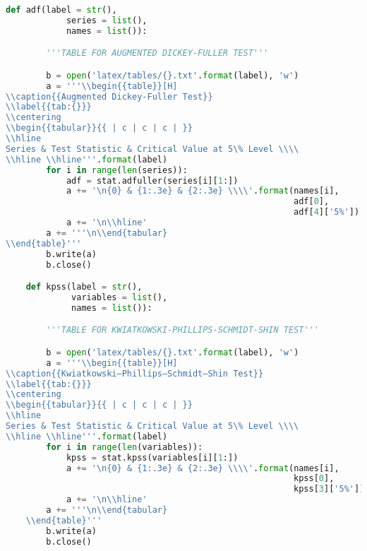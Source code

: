 \begin{lstlisting}[language=Python]
    def adf(label = str(),
            series = list(),
            names = list()):

        '''TABLE FOR AUGMENTED DICKEY-FULLER TEST'''

        b = open('latex/tables/{}.txt'.format(label), 'w')
        a = '''\\begin{{table}}[H]
\\caption{{Augmented Dickey-Fuller Test}}
\\label{{tab:{}}}
\\centering
\\begin{{tabular}}{{ | c | c | c | }}
\\hline
Series & Test Statistic & Critical Value at 5\% Level \\\\
\\hline \\hline'''.format(label)
        for i in range(len(series)):
            adf = stat.adfuller(series[i][1:])
            a += '\n{0} & {1:.3e} & {2:.3e} \\\\'.format(names[i],
                                                         adf[0],
                                                         adf[4]['5%'])
            a += '\n\\hline'
        a += '''\n\\end{tabular}
\\end{table}'''
        b.write(a)
        b.close()

    def kpss(label = str(),
             variables = list(),
             names = list()):

        '''TABLE FOR KWIATKOWSKI-PHILLIPS-SCHMIDT-SHIN TEST'''

        b = open('latex/tables/{}.txt'.format(label), 'w')
        a = '''\\begin{{table}}[H]
\\caption{{Kwiatkowski–Phillips–Schmidt–Shin Test}}
\\label{{tab:{}}}
\\centering
\\begin{{tabular}}{{ | c | c | c | }}
\\hline
Series & Test Statistic & Critical Value at 5\% Level \\\\
\\hline \\hline'''.format(label)
        for i in range(len(variables)):
            kpss = stat.kpss(variables[i][1:])
            a += '\n{0} & {1:.3e} & {2:.3e} \\\\'.format(names[i],
                                                         kpss[0],
                                                         kpss[3]['5%'])
            a += '\n\\hline'
        a += '''\n\\end{tabular}
    \\end{table}'''
        b.write(a)
        b.close()


\end{lstlisting}
